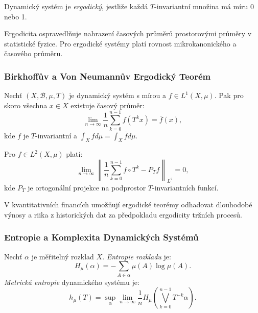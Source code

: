 \begin{definition}[Ergodicita]
Dynamický systém je \emph{ergodický}, jestliže každá $T$-invariantní množina má míru 0 nebo 1.
\end{definition}

\begin{application}
Ergodicita ospravedlňuje nahrazení časových průměrů prostorovými průměry v statistické fyzice. Pro ergodické systémy platí rovnost mikrokanonického a časového průměru.
\end{application}

\subsubsection{Birkhoffův a Von Neumannův Ergodický Teorém}

\begin{theorem}
Nechť $(X, \mathcal{B}, \mu, T)$ je dynamický systém s mírou a $f \in L^1(X, \mu)$. Pak pro skoro všechna $x \in X$ existuje časový průměr:
\[
\lim_{n \to \infty} \frac{1}{n} \sum_{k=0}^{n-1} f(T^k x) = \bar{f}(x),
\]
kde $\bar{f}$ je $T$-invariantní a $\int_X f d\mu = \int_X \bar{f} d\mu$.
\end{theorem}

\begin{theorem}
Pro $f \in L^2(X, \mu)$ platí:
\[
\lim_{n \to \infty} \left\| \frac{1}{n} \sum_{k=0}^{n-1} f \circ T^k - P_T f \right\|_{L^2} = 0,
\]
kde $P_T$ je ortogonální projekce na podprostor $T$-invariantních funkcí.
\end{theorem}

\begin{application}
V kvantitativních financích umožňují ergodické teorémy odhadovat dlouhodobé výnosy a riika z historických dat za předpokladu ergodicity tržních procesů.
\end{application}

\subsubsection{Entropie a Komplexita Dynamických Systémů}

\begin{definition}
Nechť $\alpha$ je měřitelný rozklad $X$. \emph{Entropie rozkladu} je:
\[
H_\mu(\alpha) = -\sum_{A \in \alpha} \mu(A) \log \mu(A).
\]
\emph{Metrická entropie} dynamického systému je:
\[
h_\mu(T) = \sup_{\alpha} \lim_{n \to \infty} \frac{1}{n} H_\mu\left( \bigvee_{k=0}^{n-1} T^{-k} \alpha \right).
\]
\end{definition}

